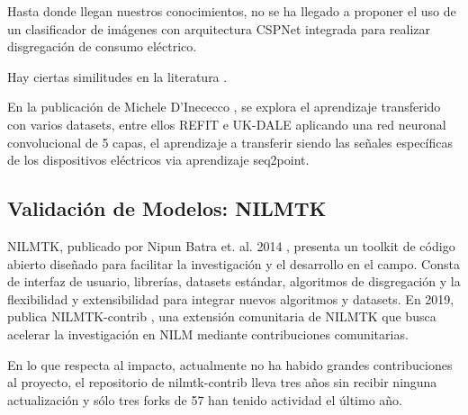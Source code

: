 Hasta donde llegan nuestros conocimientos, no se ha llegado a proponer el uso de un clasificador de imágenes con arquitectura CSPNet integrada para realizar disgregación de consumo eléctrico. 

Hay ciertas similitudes en la literatura \autocite{Radoslav2023}. 
\autocite{Xia2019}

En la publicación de Michele D'Inececco \autocite{Inecco2019}, se explora el aprendizaje transferido con varios datasets, entre ellos REFIT e UK-DALE aplicando una red neuronal convolucional de 5 capas, el aprendizaje a transferir siendo las señales específicas de los dispositivos eléctricos via aprendizaje seq2point.

\subsection{Validación de Modelos: NILMTK}  
NILMTK, publicado por Nipun Batra et. al. 2014 \autocite{Nipun2014}, presenta un toolkit de código abierto diseñado para facilitar la investigación y el desarrollo en el campo. Consta de interfaz de usuario, librerías, datasets estándar, algoritmos de disgregación y la flexibilidad y extensibilidad para integrar nuevos algoritmos y datasets. 
En 2019, publica NILMTK-contrib \autocite{Nipun2019}, una extensión comunitaria de NILMTK que busca acelerar la investigación en NILM mediante contribuciones comunitarias. 

En lo que respecta al impacto, actualmente no ha habido grandes contribuciones al proyecto, el repositorio de nilmtk-contrib lleva tres años sin recibir ninguna actualización y sólo tres forks de 57 han tenido actividad el último año.
